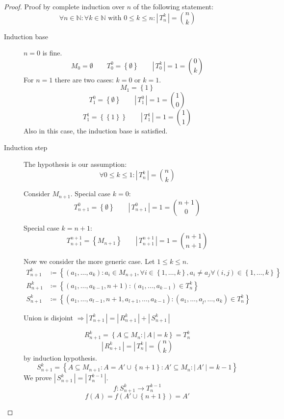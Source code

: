 \documentclass[a4paper,landscape,twocolumn]{article}
\theoremstyle{definition}
\newcommand\set[1]{\left\{#1\right\}}
\newcommand\card[1]{\left|\,#1\,\right|}
\begin{document}
\begin{proof}
  Proof by complete induction over $n$ of the following statement:
  \[
    \forall n \in \mathbb{N}: \forall k \in \mathbb{N} \text{ with } 0 \leq k \leq n:
    \card{T_n^k} = \binom{n}{k}
  \]
  \begin{description}
    \item[Induction base]
      $n = 0$ is fine.
      \[
        M_0 = \emptyset \qquad
        T_0^0 = \set{\emptyset} \qquad
        \card{T_0^k} = 1 = \binom{0}{k}
      \]
      For $n = 1$ there are two cases: $k = 0$ or $k = 1$.
      \[ M_1 = \set{1} \]
      \[ T_1^0 = \set{\emptyset} \qquad \card{T_1^0} = 1 = \binom{1}{0} \]
      \[ T_1^1 = \set{\set{1}} \qquad \card{T_1^1} = 1 = \binom{1}{1} \]
      Also in this case, the induction base is satisfied.
    \item[Induction step]
      The hypothesis is our assumption:
      \[ \forall 0 \leq k \leq 1: \card{T_n^k} = \binom{n}{k} \]

      Consider $M_{n+1}$. Special case $k = 0$:
      \[ T_{n+1}^0 = \set{\emptyset} \qquad \card{T_{n+1}^0} = 1 = \binom{n+1}{0} \]

      Special case $k = n + 1$:
      \[ T_{n+1}^{n+1} = \set{M_{n+1}} \qquad \card{T_{n+1}^{n+1}} = 1 = \binom{n+1}{n+1} \]

      Now we consider the more generic case. Let $1 \leq k \leq n$.
      \begin{align*}
        T_{n+1}^k &\coloneqq \set{(a_1, \ldots, a_k) : a_i \in M_{n+1}, \forall i \in \set{1, \ldots, k}, a_i \neq a_j \forall (i,j) \in \set{1, \ldots, k}} \\
        R_{n+1}^k &\coloneqq \set{(a_1, \ldots, a_{k-1}, n+1): (a_1, \ldots, a_{k-1}) \in T_n^k} \\
        S_{n+1}^k &\coloneqq \set{(a_1, \ldots, a_{l-1}, n+1, a_{l+1}, \ldots, a_{k-1}): (a_1, \ldots, a_{\hat{l}}, \ldots, a_k) \in T_n^k}
      \end{align*}

      Union is disjoint $\Rightarrow \card{T_{n+1}^k} = \card{R_{n+1}^k} + \card{S_{n+1}^k}$

      \[ R_{n+1}^k = \set{A \subseteq M_n: \card{A} = k} = T_n^k \]
      \[ \card{R_{n+1}^k} = \card{T_n^k} = \binom{n}{k} \]
      by induction hypothesis.
      \[ S_{n+1}^k = \set{A \subseteq M_{n+1}: A = A' \cup \set{n+1}: A' \subseteq M_n: \card{A'} = k - 1} \]
      We prove $\card{S_{n+1}^k} = \card{T_n^{k-1}}$.
      \[ f: S_{n+1}^k \rightarrow T_n^{k-1} \]
      \[ f(A) = f(A' \cup \set{n+1}) = A' \]


\end{description}
\end{proof}
\end{document}
